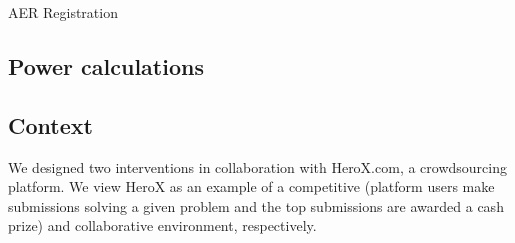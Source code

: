 \documentclass[12pt, titlepage]{article}
\begin{document}
AER Registration

\subsection{Power calculations}\label{power-calculations}

\subsection{Context}\label{context}

We designed two interventions in collaboration with HeroX.com, a
crowdsourcing platform. We view HeroX as an example of a competitive
(platform users make submissions solving a given problem and the top
submissions are awarded a cash prize) and collaborative environment,
respectively.

\renewcommand\refname{References}

\end{document}
